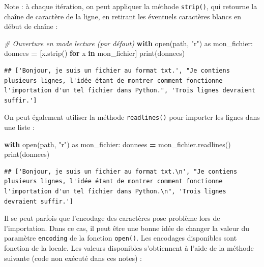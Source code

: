 \documentclass[
  12pt,
]{book}
\newenvironment{Shaded}{\begin{snugshade}}{\end{snugshade}}
\newcommand{\BuiltInTok}[1]{#1}
\newcommand{\CommentTok}[1]{\textcolor[rgb]{0.56,0.35,0.01}{\textit{#1}}}
\newcommand{\ControlFlowTok}[1]{\textcolor[rgb]{0.13,0.29,0.53}{\textbf{#1}}}
\newcommand{\ImportTok}[1]{#1}
\newcommand{\KeywordTok}[1]{\textcolor[rgb]{0.13,0.29,0.53}{\textbf{#1}}}
\newcommand{\NormalTok}[1]{#1}
\newcommand{\OperatorTok}[1]{\textcolor[rgb]{0.81,0.36,0.00}{\textbf{#1}}}
\newcommand{\StringTok}[1]{\textcolor[rgb]{0.31,0.60,0.02}{#1}}
\numberwithin{equation}{section}
\numberwithin{countremarque}{section}
\begin{document}
Note : à chaque itération, on peut appliquer la méthode \texttt{strip()}, qui retourne la chaîne de caractère de la ligne, en retirant les éventuels caractères blancs en début de chaîne :

\begin{Shaded}
\begin{Highlighting}[]
\CommentTok{\# Ouverture en mode lecture (par défaut)}
\ControlFlowTok{with} \BuiltInTok{open}\NormalTok{(path, }\StringTok{"r"}\NormalTok{) }\ImportTok{as}\NormalTok{ mon\_fichier:}
\NormalTok{  donnees }\OperatorTok{=}\NormalTok{ [x.strip() }\ControlFlowTok{for}\NormalTok{ x }\KeywordTok{in}\NormalTok{ mon\_fichier]}
\BuiltInTok{print}\NormalTok{(donnees)}
\end{Highlighting}
\end{Shaded}

\begin{lstlisting}
## ['Bonjour, je suis un fichier au format txt.', "Je contiens plusieurs lignes, l'idée étant de montrer comment fonctionne l'importation d'un tel fichier dans Python.", 'Trois lignes devraient suffir.']
\end{lstlisting}

On peut également utiliser la méthode \texttt{readlines()} pour importer les lignes dans une liste :

\begin{Shaded}
\begin{Highlighting}[]
\ControlFlowTok{with} \BuiltInTok{open}\NormalTok{(path, }\StringTok{"r"}\NormalTok{) }\ImportTok{as}\NormalTok{ mon\_fichier:}
\NormalTok{    donnees }\OperatorTok{=}\NormalTok{ mon\_fichier.readlines()}
\BuiltInTok{print}\NormalTok{(donnees)}
\end{Highlighting}
\end{Shaded}

\begin{lstlisting}
## ['Bonjour, je suis un fichier au format txt.\n', "Je contiens plusieurs lignes, l'idée étant de montrer comment fonctionne l'importation d'un tel fichier dans Python.\n", 'Trois lignes devraient suffir.']
\end{lstlisting}

Il se peut parfois que l'encodage des caractères pose problème lors de l'importation. Dans ce cas, il peut être une bonne idée de changer la valeur du paramètre \texttt{encoding} de la fonction \texttt{open()}. Les encodages disponibles sont fonction de la locale. Les valeurs disponibles s'obtiennent à l'aide de la méthode suivante (code non exécuté dans ces notes) :
\end{document}
